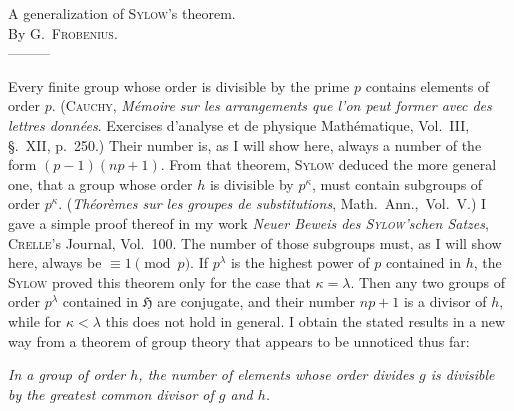 \documentclass[a5paper,12pt]{article}
\newcommand{\secformat}[1]{\centering{\normalfont\normalsize{#1}}}
\let\fr\mathfrak
\newcommand{\CH}{\fr{H}}
\newcommand{\?}{{\color{blue}${}^{(?)}$}}
\newcounter{origpagecounter}{}
\newcommand{\origpagefirst}[1]{\smash{\setcounter{origpagecounter}{#1}\mark{\arabic{origpagecounter}}}}
\begin{document}

\thispagestyle{empty}
\origpagefirst{981}

\begin{center}
	{\Large
		{A generalization of \textsc{Sylow}'s theorem.}
		\\
	}
	{\large
		{By \textsc{G.~Frobenius}.}
		\\
		---------
	}
\end{center}



\noindent
%
Every finite group whose order
is divisible by the prime $p$
contains elements of order $p$.
%
%
(\textsc{Cauchy}, 
\emph{M\'emoire sur les arrangements que l'on peut former avec des lettres donn\'ees}.
Exercises d'analyse et de physique Math\'ematique,
Vol.~III,
\S.~XII,
p.~250.)
%
%
Their number is, 
as I will show here,
always a number of the form 
$(p - 1) (n p + 1)$.
%
%
From that theorem,
\textsc{Sylow} deduced the more general one,
that a group
whose order $h$ is divisible by $p^\kappa$,
must contain subgroups of order $p^\kappa$.
%
%
(\emph{Th\'eor\`emes sur les groupes de substitutions},
Math.~Ann.,~Vol.~V.)
%
%
I gave a simple proof thereof
in my work
\emph{Neuer Beweis des \textsc{Sylow}'schen Satzes},
\textsc{Crelle}'s Journal,
Vol.~100.
%
%
The number of those subgroups must,
as I will show here,
always be $\equiv 1 \pmod{p}$.
%
%
If $p^\lambda$ is the highest power of $p$
contained in $h$,
the \textsc{Sylow} proved this theorem
only for the case that $\kappa = \lambda$.
%
%
Then any two groups of order $p^\lambda$ 
contained in $\CH$
are conjugate,
and their number $n p + 1$
is a divisor of $h$,
while for $\kappa < \lambda$
this does not hold in general.
%
%
I obtain the stated results 
in a new way
from a theorem of group theory
that appears to be unnoticed thus far:


\emph{ %
In a group of order $h$,
the number of elements
whose order divides $g$
is divisible by 
the greatest common divisor
of $g$ and $h$.
}



\subsubsection*{\secformat{\S.~1.}}
\end{document}
